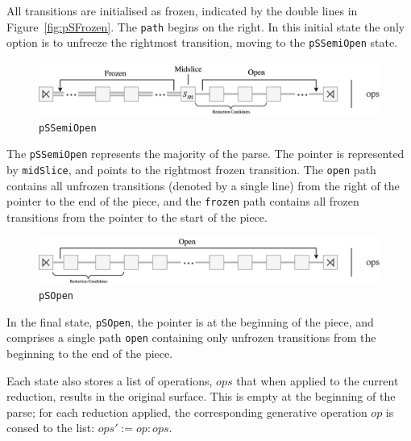 \documentclass[12pt,a4paper,twoside,openany]{report} \usepackage[pdfborder={0 0 0}]{hyperref}    %
\theoremstyle{definition} \newtheorem{definition}{Definition}[section]
\begin{document}
      All transitions are initialised as frozen, indicated by the double lines in Figure~\ref{fig:pSFrozen}. The
      \texttt{path} begins on the right. In this initial state the only option is to unfreeze the rightmost transition,
      moving to the \texttt{pSSemiOpen} state. 

      \begin{figure}[h] \centering\includegraphics[width=\textwidth]{impl/parseState/semiopen.png}
      \caption{\texttt{pSSemiOpen}} \label{fig:pSSemiOpen} \end{figure}

      The \texttt{pSSemiOpen} represents the majority of the parse. The pointer is represented by \texttt{midSlice}, and
      points to the rightmost frozen transition. The \texttt{open} path contains all unfrozen transitions (denoted by
      a single line) from the right of the pointer to the end of the piece, and the \texttt{frozen} path contains all
      frozen transitions from the pointer to the start of the piece.

      \begin{figure}[h] \centering\includegraphics[width=\textwidth]{impl/parseState/open.png} \caption{\texttt{pSOpen}}
      \label{fig:pSOpen} \end{figure}

      In the final state, \texttt{pSOpen}, the pointer is at the beginning of the piece, and comprises a single path
      \texttt{open} containing only unfrozen transitions from the beginning to the end of the piece.

      Each state also stores a list of operations, $ops$ that when applied to the current reduction, results in the
      original surface. This is empty at the beginning of the parse; for each reduction applied, the corresponding
      generative operation $op$ is consed to the list: $ops' := op:ops$. 
\end{document}
